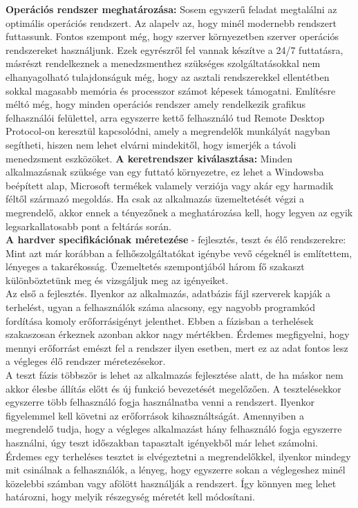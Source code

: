 \documentclass[12pt,oneside,justify,table]{book}
\begin{document}
\textbf{Operációs rendszer meghatározása:} Sosem egyszerű feladat megtalálni az optimális operációs rendszert. Az alapelv az, hogy minél modernebb rendszert futtassunk. Fontos szempont még, hogy szerver környezetben szerver operációs rendszereket használjunk. Ezek egyrészről fel vannak készítve a 24/7 futtatásra, másrészt rendelkeznek a menedzsmenthez szükséges szolgáltatásokkal nem elhanyagolható tulajdonságuk még, hogy az asztali rendszerekkel ellentétben sokkal magasabb memória és processzor számot képesek támogatni. Említésre méltó még, hogy minden operációs rendszer amely rendelkezik grafikus felhasználói felülettel, arra egyszerre kettő felhasználó tud Remote Desktop Protocol-on keresztül kapcsolódni, amely a megrendelők munkályát nagyban segítheti, hiszen nem lehet elvárni mindekitől, hogy ismerjék a távoli menedzsment eszközöket. \newline
\indent\textbf{A keretrendszer kiválasztása:} Minden alkalmazásnak szüksége van egy futtató környezetre, ez lehet a Windowsba beépített alap, Microsoft termékek valamely verziója vagy akár egy harmadik féltől származó megoldás. Ha csak az alkalmazás üzemeltetését végzi a megrendelő, akkor ennek a tényezőnek a meghatározása kell, hogy legyen az egyik legsarkallatosabb pont a feltárás során.  \\
\indent\textbf{A hardver specifikációnak méretezése} - fejlesztés, teszt és élő rendszerekre: Mint azt már korábban a felhőszolgáltatókat igénybe vevő cégeknél is említettem, lényeges a takarékosság. Üzemeltetés szempontjából három fő szakaszt különböztetünk meg és vizsgáljuk meg az igényeiket. \\ Az első a fejlesztés. Ilyenkor az alkalmazás, adatbázis fájl szerverek kapják a terhelést, ugyan a felhasználók száma alacsony, egy nagyobb programkód fordítása komoly erőforrásigényt jelenthet. Ebben a fázisban a terhelések szakaszosan érkeznek azonban akkor nagy mértékben. Érdemes megfigyelni, hogy mennyi erőforrást emészt fel a rendszer ilyen esetben, mert ez az adat fontos lesz a végleges élő rendszer méretezésekor. \\ A teszt fázis többször is lehet az alkalmazás fejlesztése alatt, de ha máskor nem akkor élesbe állítás előtt és új funkció bevezetését megelőzően. A tesztelésekkor egyszerre több felhasználó fogja használnatba venni a rendszert. Ilyenkor figyelemmel kell követni az erőforrások kihasználtságát. Amennyiben a megrendelő tudja, hogy a végleges alkalmazást hány felhasználó fogja egyszerre használni, úgy teszt időszakban tapasztalt igényekből már lehet számolni. Érdemes egy terheléses tesztet is elvégeztetni a megrendelőkkel, ilyenkor mindegy mit csinálnak a felhasználók, a lényeg, hogy egyszerre sokan a véglegeshez minél közelebbi számban vagy afölött használják a rendszert. Így könnyen meg lehet határozni, hogy melyik részegység méretét kell módosítani.  \\
\end{document}
